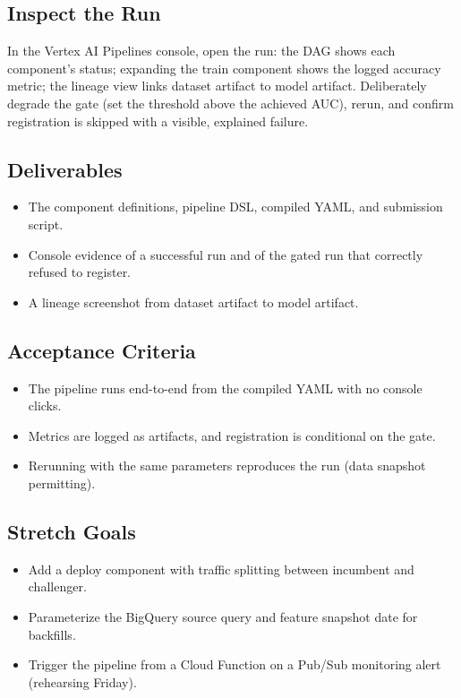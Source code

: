 \subsection{Inspect the Run}
In the Vertex AI Pipelines console, open the run: the DAG shows each component's status; expanding the train component shows the logged accuracy metric; the lineage view links dataset artifact to model artifact. Deliberately degrade the gate (set the threshold above the achieved AUC), rerun, and confirm registration is skipped with a visible, explained failure.

\subsection*{Deliverables}
\begin{itemize}
    \item The component definitions, pipeline DSL, compiled YAML, and submission script.
    \item Console evidence of a successful run and of the gated run that correctly refused to register.
    \item A lineage screenshot from dataset artifact to model artifact.
\end{itemize}

\subsection*{Acceptance Criteria}
\begin{itemize}
    \item The pipeline runs end-to-end from the compiled YAML with no console clicks.
    \item Metrics are logged as artifacts, and registration is conditional on the gate.
    \item Rerunning with the same parameters reproduces the run (data snapshot permitting).
\end{itemize}

\subsection*{Stretch Goals}
\begin{itemize}
    \item Add a deploy component with traffic splitting between incumbent and challenger.
    \item Parameterize the BigQuery source query and feature snapshot date for backfills.
    \item Trigger the pipeline from a Cloud Function on a Pub/Sub monitoring alert (rehearsing Friday).
\end{itemize}

